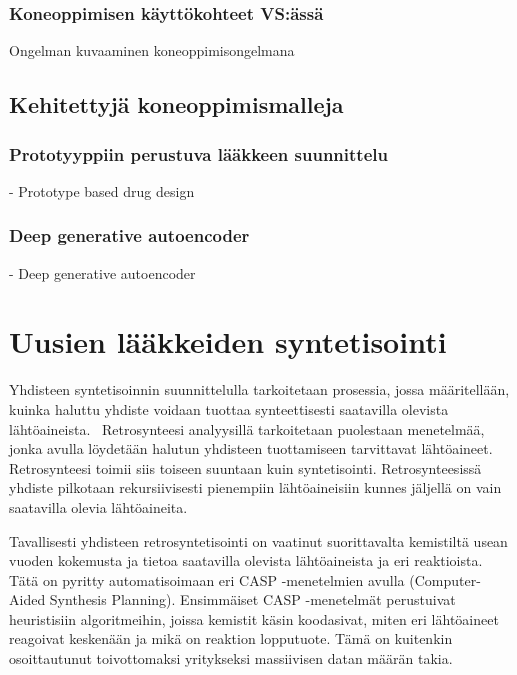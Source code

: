 \documentclass[finnish,twoside,censored,subject,sw-line]{HYthesisML}
\begin{document}
\subsection{Koneoppimisen käyttökohteet VS:ässä}

Ongelman kuvaaminen koneoppimisongelmana~\cite{ShaharHarelAndKiraRadinsky,KadurinArtur2017dAAG}

\section{Kehitettyjä koneoppimismalleja}

\subsection{Prototyyppiin perustuva lääkkeen suunnittelu}
- Prototype based drug design~\cite{ShaharHarelAndKiraRadinsky}

\subsection{Deep generative autoencoder}
- Deep generative autoencoder~\cite{KadurinArtur2017dAAG}

\chapter{Uusien lääkkeiden syntetisointi}

Yhdisteen syntetisoinnin suunnittelulla tarkoitetaan prosessia, jossa määritellään, kuinka haluttu yhdiste voidaan
tuottaa synteettisesti saatavilla olevista lähtöaineista.~\cite{ColeyConnorW2018MLiC} Retrosynteesi analyysillä
tarkoitetaan puolestaan menetelmää, jonka avulla löydetään halutun yhdisteen tuottamiseen tarvittavat lähtöaineet.
Retrosynteesi toimii siis toiseen suuntaan kuin syntetisointi. Retrosynteesissä yhdiste pilkotaan rekursiivisesti
pienempiin lähtöaineisiin kunnes jäljellä on vain saatavilla olevia lähtöaineita.

Tavallisesti yhdisteen retrosyntetisointi on vaatinut suorittavalta kemistiltä usean vuoden kokemusta ja tietoa
saatavilla olevista lähtöaineista ja eri reaktioista. Tätä on pyritty automatisoimaan eri CASP -menetelmien avulla (Computer-Aided Synthesis Planning).
Ensimmäiset CASP -menetelmät perustuivat heuristisiin algoritmeihin, joissa kemistit käsin koodasivat, miten eri lähtöaineet reagoivat keskenään ja
mikä on reaktion lopputuote. Tämä on kuitenkin osoittautunut toivottomaksi yritykseksi massiivisen datan määrän takia.
\end{document}
